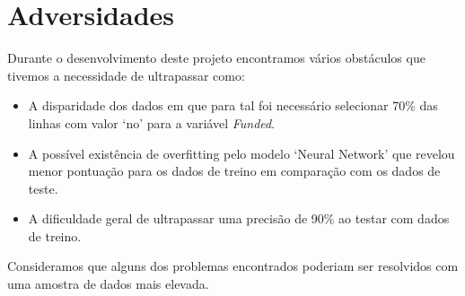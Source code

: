 \section*{Adversidades}

Durante o desenvolvimento deste projeto encontramos vários obstáculos que tivemos a necessidade de ultrapassar como:
\begin{itemize}
    \item A disparidade dos dados em que para tal foi necessário selecionar 70\% das linhas com valor `no' para a variável \textit{Funded}.
    \item A possível existência de overfitting pelo modelo `Neural Network' que revelou menor pontuação para os dados de treino em comparação com os dados de teste.
    \item A dificuldade geral de ultrapassar uma precisão de 90\% ao testar com dados de treino.
\end{itemize}

Consideramos que alguns dos problemas encontrados poderiam ser resolvidos com uma amostra de dados mais elevada.